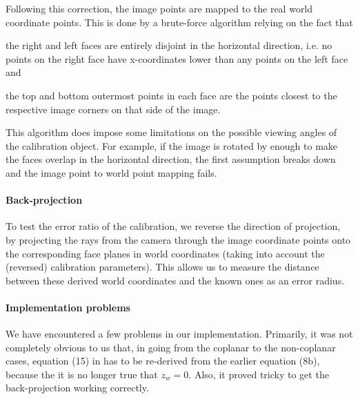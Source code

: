 Following this correction, the image points are mapped to the real
world coordinate points. This is done by a brute-force algorithm
relying on the fact that
\begin{inparaenum}
  \item the right and left faces are entirely disjoint in the
    horizontal direction, i.e. no points on the right face have
    x-coordinates lower than any points on the left face and
  \item the top and bottom outermost points in each face are the
    points closest to the respective image corners on that side of the
    image.
\end{inparaenum}
This algorithm does impose some limitations on the possible viewing
angles of the calibration object. For example, if the image is rotated
by enough to make the faces overlap in the horizontal direction, the
first assumption breaks down and the image point to world point
mapping fails.

\paragraph{Back-projection}

To test the error ratio of the calibration, we reverse the direction
of projection, by projecting the rays from the camera through the
image coordinate points onto the corresponding face planes in world
coordinates (taking into account the (reversed) calibration
parameters). This allows us to measure the distance between these
derived world coordinates and the known ones as an error radius.

\paragraph{Implementation problems}

We have encountered a few problems in our implementation. Primarily,
it was not completely obvious to us that, in going from the coplanar
to the non-coplanar cases, equation (15) in \cite{TSAI} has to be
re-derived from the earlier equation (8b), because the it is no longer
true that $z_w=0$. Also, it proved tricky to get the back-projection
working correctly.

%
%
%
%
%
